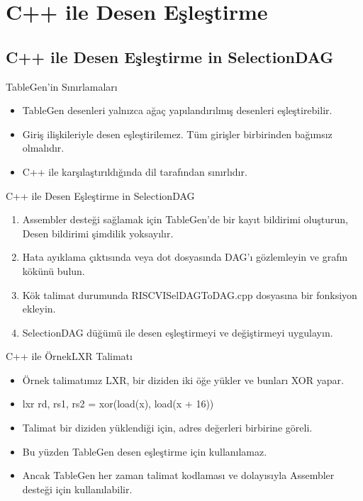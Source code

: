 
\section{C++ ile Desen Eşleştirme}

\subsection{C++ ile Desen Eşleştirme in SelectionDAG}
\begin{frame}[fragile]{TableGen'in Sınırlamaları}
\begin{itemize}
    \item TableGen desenleri yalnızca ağaç yapılandırılmış desenleri eşleştirebilir.
    \item Giriş ilişkileriyle desen eşleştirilemez. Tüm girişler birbirinden bağımsız olmalıdır.
    \item C++ ile karşılaştırıldığında dil tarafından sınırlıdır.
\end{itemize}


\end{frame}

\begin{frame}{C++ ile Desen Eşleştirme in SelectionDAG}
\begin{enumerate}
    \item Assembler desteği sağlamak için TableGen'de bir kayıt bildirimi oluşturun, Desen bildirimi şimdilik yoksayılır.
    \item Hata ayıklama çıktısında veya dot dosyasında DAG'ı gözlemleyin ve grafın kökünü bulun. 
    \item Kök talimat durumunda RISCVISelDAGToDAG.cpp dosyasına bir fonksiyon ekleyin. 
    \item SelectionDAG düğümü ile desen eşleştirmeyi ve değiştirmeyi uygulayın.
\end{enumerate}
\end{frame}

\begin{frame}{C++ ile Örnek}{LXR Talimatı}
\begin{itemize}
    \item Örnek talimatımız LXR, bir diziden iki öğe yükler ve bunları XOR yapar.
    \item lxr rd, rs1, rs2 = xor(load(x), load(x + 16))

    \item Talimat bir diziden yüklendiği için, adres değerleri birbirine göreli. 
    \item Bu yüzden TableGen desen eşleştirme için kullanılamaz.
    \item Ancak TableGen her zaman talimat kodlaması ve dolayısıyla Assembler desteği için kullanılabilir.
\end{itemize}
\end{frame}

